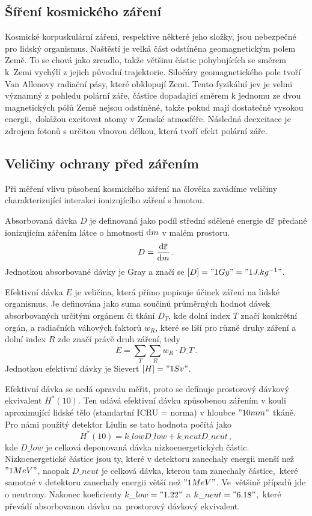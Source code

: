 \documentclass[12pt,a4paper]{article}
\begin{document}
\subsection*{Šíření kosmického záření}
Kosmické korpuskulární záření, respektive některé jeho složky, jsou nebezpečné
pro lidský organismus. Naštěstí je velká část odstíněna geomagnetickým polem
Země. To se chová jako zrcadlo, takže většinu částic pohybujících se směrem
k~Zemi vychýlí z jejich původní trajektorie. Siločáry geomagnetického pole tvoří
Van Allenovy radiační pásy, které obklopují Zemi. Tento fyzikální jev je velmi
významný z pohledu polární záře, částice dopadající směrem k jednomu ze dvou
magnetických pólů Země nejsou odstíněné, takže pokud mají dostatečně vysokou
energii,~dokážou excitovat atomy v Zemské atmosféře. Následná deexcitace je
zdrojem fotonů s určitou vlnovou délkou, která tvoří efekt polární záře.\par
\subsection*{Veličiny ochrany před zářením}
Při měření vlivu působení kosmického záření na člověka zavádíme veličiny
charakterizující interakci ionizujícího záření s hmotou.\par
Absorbovaná dávka $D$ je definovaná jako podíl střední sdělené energie
$\mathrm{d} \overline{\varepsilon}$ předané ionizujícím zářením látce o hmotnosti
$\mathrm{d} m$ v malém prostoru.
$$D=\frac{\mathrm{d} \overline{\varepsilon}}{\mathrm{d} m}\,.$$
Jednotkou absorbované dávky je Gray a značí se ${[D]="1 Gy"="1 J.kg^{-1}"}$.\par
Efektivní dávka $E$ je veličina, která přímo popisuje účinek záření na lidské
organismus. Je definována jako suma součinů průměrných hodnot dávek
absorbovaných určitým orgánem či tkání $D_T$, kde dolní index $T$ značí
konkrétní orgán, a radiačních váhových faktorů $w_R$, které se liší pro různé
druhy záření a dolní index $R$ zde značí právě druh záření, tedy
$$E=\sum_{T}\sum_{R} w_R\cdot D\_{T}\,.$$
Jednotkou efektivní dávky je Sievert ${[H]="1 Sv"}$.\par
Efektivní dávka se nedá opravdu měřit, proto se definuje prostorový dávkový
ekvivalent $ H^\ast(10) $. Ten udává efektivní dávku způsobenou zářením v kouli
aproximující lidské tělo (standartní ICRU = norma) v hloubce $"10 mm"$ tkáně.
Pro námi použitý detektor Liulin se tato hodnota počítá jako
$$H^\ast(10)=k\_{low}D\_{low}+k\_{neut}D\_{neut}\,,$$
kde $D\_{low}$ je celková deponovaná dávka nízkoenergetických částic.
Nízkoenergetické částice jsou ty, které v detektoru zanechaly energii menší než
$ "1 MeV" $, naopak $ D\_{neut} $ je celková dávka, kterou tam zanechaly
částice,~které samotné v detektoru zanechaly energii větší než $ "1 MeV" $.
Ve~většině případů jde o neutrony. Nakonec koeficienty
$ k\_{low}="1.22" $ a $ k\_{neut}="6.18" $,~které převádí absorbovanou dávku
na~prostorový dávkový ekvivalent.\par
\end{document}
